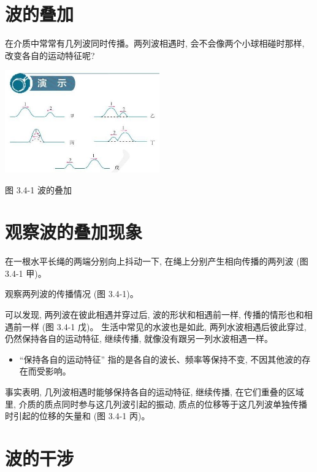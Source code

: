 \documentclass[10pt]{article}
\begin{document}
\section*{波的叠加}

在介质中常常有几列波同时传播。两列波相遇时, 会不会像两个小球相碰时那样, 改变各自的运动特征呢?

\begin{center}
\includegraphics[max width=0.5\textwidth]{images/01910e4c-ebb8-7d2c-8f2f-2375bc1d2d12_79_467345.jpg}
\end{center}

图 3.4-1 波的叠加

\section*{观察波的叠加现象}

在一根水平长绳的两端分别向上抖动一下, 在绳上分别产生相向传播的两列波 (图 3.4-1 甲)。

观察两列波的传播情况 (图 3.4-1)。

可以发现, 两列波在彼此相遇并穿过后, 波的形状和相遇前一样, 传播的情形也和相遇前一样 (图 3.4-1 戊)。 生活中常见的水波也是如此, 两列水波相遇后彼此穿过, 仍然保持各自的运动特征, 继续传播, 就像没有跟另一列水波相遇一样。

\begin{mdframed}

\begin{itemize}
\item “保持各自的运动特征” 指的是各自的波长、频率等保持不变, 不因其他波的存在而受影响。
\end{itemize}

\end{mdframed}

事实表明, 几列波相遇时能够保持各自的运动特征, 继续传播, 在它们重叠的区域里, 介质的质点同时参与这几列波引起的振动, 质点的位移等于这几列波单独传播时引起的位移的矢量和 (图 3.4-1 丙)。

\section*{波的干涉}
\end{document}
